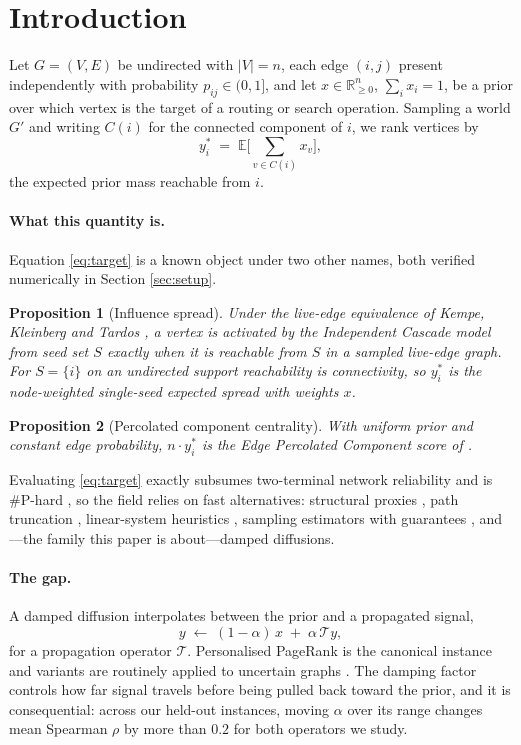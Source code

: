\documentclass[11pt,a4paper]{article}
\newtheorem{proposition}{Proposition}
\begin{document}
\section{Introduction}

Let $G=(V,E)$ be undirected with $|V|=n$, each edge $(i,j)$ present
independently with probability $p_{ij}\in(0,1]$, and let
$x\in\mathbb{R}^n_{\ge0}$, $\sum_i x_i=1$, be a prior over which vertex is the
target of a routing or search operation. Sampling a world $G'$ and writing
$C(i)$ for the connected component of $i$, we rank vertices by
\begin{equation}
y^*_i \;=\; \mathbb{E}\Big[\textstyle\sum_{v\in C(i)} x_v\Big],
\label{eq:target}
\end{equation}
the expected prior mass reachable from $i$.

\paragraph{What this quantity is.} Equation \eqref{eq:target} is a known object
under two other names, both verified numerically in Section \ref{sec:setup}.

\begin{proposition}[Influence spread]
Under the live-edge equivalence of Kempe, Kleinberg and Tardos \cite{kkt03}, a
vertex is activated by the Independent Cascade model from seed set $S$ exactly
when it is reachable from $S$ in a sampled live-edge graph. For $S=\{i\}$ on an
undirected support reachability is connectivity, so $y^*_i$ is the node-weighted
single-seed expected spread with weights $x$.
\end{proposition}

\begin{proposition}[Percolated component centrality]
With uniform prior and constant edge probability, $n\cdot y^*_i$ is the Edge
Percolated Component score of \cite{hubba08,cytohubba14}.
\end{proposition}

\noindent
Evaluating \eqref{eq:target} exactly subsumes two-terminal network reliability
and is \#P-hard \cite{valiant79,provanball83}, so the field relies on fast
alternatives: structural proxies \cite{degdisc09}, path truncation
\cite{pmia10}, linear-system heuristics \cite{irie12}, sampling estimators with
guarantees \cite{borgs14,tim14,imm15,skim14}, and---the family this paper is
about---damped diffusions.

\paragraph{The gap.} A damped diffusion interpolates between the prior and a
propagated signal,
\[
y \;\leftarrow\; (1-\alpha)\,x \;+\; \alpha\,\mathcal{T}y ,
\]
for a propagation operator $\mathcal{T}$. Personalised PageRank
\cite{pagerank99,haveliwala03} is the canonical instance and variants are
routinely applied to uncertain graphs \cite{kim17,pfeiffer11}. The damping
factor controls how far signal travels before being pulled back toward the
prior, and it is consequential: across our held-out instances, moving $\alpha$
over its range changes mean Spearman $\rho$ by more than $0.2$ for both
operators we study.
\end{document}
